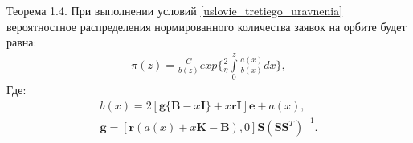 Теорема 1.4. При выполнении условий \eqref{uslovie_tretiego_uravnenia}
вероятностное распределения нормированного
количества заявок на орбите будет равна:
\begin{align}
    \pi (z)=
        \frac{C}{b(z)}exp\bigg\{\frac{2}{\eta} 
        \int\limits_0^z \frac{a(x)}{b(x)}dx\bigg\},
\end{align}
Где:
\begin{gather*}
    b(x)=2[\boldsymbol{g}\{\boldsymbol{B}-x\boldsymbol{I}\}+x\boldsymbol{rI}]\boldsymbol{e}+ a(x), \\
    \boldsymbol{g}=[\boldsymbol{r}(a(x)+x\boldsymbol{K}-\boldsymbol{B}), 0]\boldsymbol{S}(\boldsymbol{S}\boldsymbol{S}^T)^{-1}.
\end{gather*}




